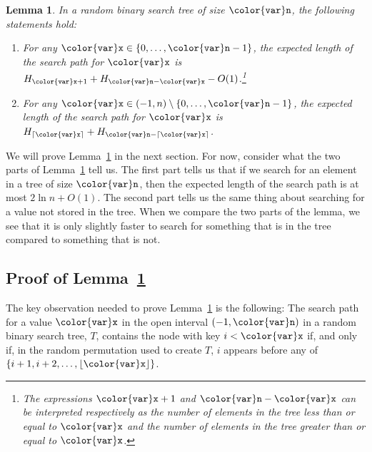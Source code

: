 \documentclass[10pt]{book}
\theoremstyle{plain}
\newtheorem{lem}{Lemma}[chapter]
\newcommand{\lemlabel}[1]{\label{lem:#1}}
\newcommand{\lemref}[1]{Lemma~\ref{lem:#1}}
\theoremstyle{definition}
\begin{document}
\begin{lem}\lemlabel{rbs}
  In a random binary search tree of size \ensuremath{\mathtt{{\color{var}n}}}, the following statements hold:
  \begin{enumerate}
    \item For any $\ensuremath{\mathtt{{\color{var}x}}}\in\{0,\ldots,\ensuremath{\mathtt{{\color{var}n}}}-1\}$, the expected length of the
    search path for \ensuremath{\mathtt{{\color{var}x}}} is $H_{\ensuremath{\mathtt{{\color{var}x}}}+1} + H_{\ensuremath{\mathtt{{\color{var}n}}}-\ensuremath{\mathtt{{\color{var}x}}}} - O(1)$.\footnote{The
    expressions $\ensuremath{\mathtt{{\color{var}x}}}+1$ and $\ensuremath{\mathtt{{\color{var}n}}}-\ensuremath{\mathtt{{\color{var}x}}}$ can be interpreted respectively
    as the number of elements in the tree less than or equal to \ensuremath{\mathtt{{\color{var}x}}}
    and the number of elements in the tree greater than or equal to \ensuremath{\mathtt{{\color{var}x}}}.}
    \item For any $\ensuremath{\mathtt{{\color{var}x}}}\in(-1,n)\setminus\{0,\ldots,\ensuremath{\mathtt{{\color{var}n}}}-1\}$, the
    expected length of the search path for \ensuremath{\mathtt{{\color{var}x}}} is $H_{\lceil\ensuremath{\mathtt{{\color{var}x}}}\rceil}
    + H_{\ensuremath{\mathtt{{\color{var}n}}}-\lceil\ensuremath{\mathtt{{\color{var}x}}}\rceil}$.
  \end{enumerate}
\end{lem}

We will prove \lemref{rbs} in the next section.  For now, consider what
the two parts of \lemref{rbs} tell us.  The first part tells us that if
we search for an element in a tree of size \ensuremath{\mathtt{{\color{var}n}}}, then the expected length
of the search path is at most $2\ln n + O(1)$.  The second part tells
us the same thing about searching for a value not stored in the tree.
When we compare the two parts of the lemma, we see that it is only
slightly faster to search for something that is in the tree compared to
something that is not.


\subsection{Proof of \lemref{rbs}}

The key observation needed to prove \lemref{rbs} is the following:
The search path for a value \ensuremath{\mathtt{{\color{var}x}}} in the open interval $(-1,\ensuremath{\mathtt{{\color{var}n}}})$ in a
random binary search tree, $T$, contains the node with key $i < \ensuremath{\mathtt{{\color{var}x}}}$
if, and only if, in the random permutation used to create $T$, $i$
appears before any of $\{i+1,i+2,\ldots,\lfloor\ensuremath{\mathtt{{\color{var}x}}}\rfloor\}$.
\end{document}
